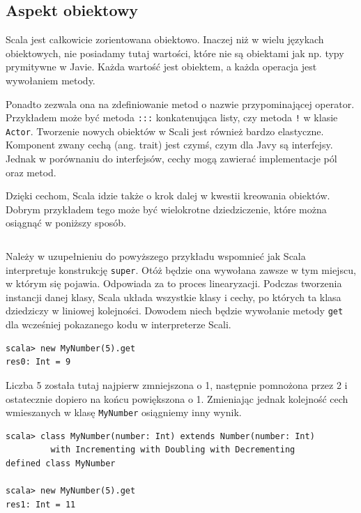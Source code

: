 \documentclass[brudnopis]{xmgr}
\begin{document}
\subsection{Aspekt obiektowy}

Scala jest całkowicie zorientowana obiektowo. Inaczej niż w wielu językach obiektowych, nie posiadamy tutaj wartości, które nie są obiektami jak np. typy prymitywne w Javie. Każda wartość jest obiektem, a każda operacja jest wywołaniem metody. 

Ponadto zezwala ona na zdefiniowanie metod o nazwie przypominającej operator. Przykładem może być metoda \texttt{:::} konkatenująca listy, czy metoda \texttt{!} w klasie \texttt{Actor}. Tworzenie nowych obiektów w Scali jest również bardzo elastyczne. Komponent zwany cechą (ang. trait) jest czymś, czym dla Javy są interfejsy. Jednak w porównaniu do interfejsów, cechy mogą zawierać implementacje pól oraz metod. 

Dzięki cechom, Scala idzie także o krok dalej w kwestii kreowania obiektów. Dobrym przykładem tego może być wielokrotne dziedziczenie, które można osiągnąć w poniższy sposób.

\inputminted[fontsize=\small]{scala}{code/multipleInheritance.scala}

Należy w uzupełnieniu do powyższego przykładu wspomnieć jak Scala interpretuje konstrukcję \texttt{super}. Otóż będzie ona wywołana zawsze w tym miejscu, w którym się pojawia. Odpowiada za to proces linearyzacji. Podczas tworzenia instancji danej klasy, Scala układa wszystkie klasy i cechy, po których ta klasa dziedziczy w liniowej kolejności. Dowodem niech będzie wywołanie metody \texttt{get} dla wcześniej pokazanego kodu w interpreterze Scali.

\begin{verbatim}
scala> new MyNumber(5).get
res0: Int = 9
\end{verbatim}

Liczba 5 została tutaj najpierw zmniejszona o 1, następnie pomnożona przez 2 i ostatecznie dopiero na końcu powiększona o 1. Zmieniając jednak kolejność cech wmieszanych w klasę \texttt{MyNumber} osiągniemy inny wynik.

\begin{verbatim}
scala> class MyNumber(number: Int) extends Number(number: Int) 
         with Incrementing with Doubling with Decrementing
defined class MyNumber

scala> new MyNumber(5).get
res1: Int = 11
\end{verbatim}
\end{document}
